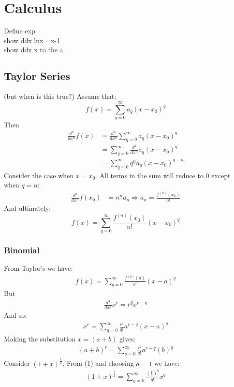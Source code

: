 \documentclass{article}
\renewcommand\({\left(}
\renewcommand\){\right)}
\begin{document}
\section{Calculus}
Define exp\\
show ddx lnx =x-1\\
show ddx x to the a\\
\subsection{Taylor Series}
(but when is this true?)
Assume that:
\[f(x)=\sum_{q=0}^\infty a_q(x-x_0)^q\]
Then
\begin{align*}
    \frac{d^n}{dx^n}f(x)&=\frac{d^n}{dx^n}\sum_{q=0}^\infty a_q(x-x_0)^q\\
    &=\sum_{q=0}^\infty \frac{d^n}{dx^n}a_q(x-x_0)^q\\
    &=\sum_{q=0}^\infty q^{\underline{n}}a_q(x-x_0)^{q-n}
\end{align*}
Consider the case when $x=x_0$. All terms in the sum will reduce to 0 except when $q=n$:
\begin{align*}
    \frac{d^n}{dx^n}f(x_0)&=n^{\underline{n}}a_n\Rightarrow a_n=\frac{f^{(n)}(x_0)}{n!}
\end{align*}
And ultimately:
\[f(x)=\sum_{q=0}^\infty \frac{f^{(n)}(x_0)}{n!}(x-x_0)^q\]
\subsubsection{Binomial}
From Taylor's we have:
\begin{align*}
    f(x)=\sum_{q=0}^\infty\frac{f^{(q)}(a)}{q!}(x-a)^q
\end{align*}
But 
\begin{align*}
    \frac{d^q}{dx^q}x^r=r^{\underline{q}}x^{r-q}
\end{align*}
And so:
\begin{align}
    x^r=\sum_{q=0}^\infty\frac{r^{\underline{q}}}{q!}a^{r-q}(x-a)^q
\end{align}
Making the substitution $x=(a+b)$ gives:
\begin{align*}
    (a+b)^r=\sum_{q=0}^\infty\frac{r^{\underline{q}}}{q!}a^{r-q}(b)^q
\end{align*}
Consider $(1+x)^\frac{1}{2}$. From (1) and choosing $a=1$ we have:
\begin{align*}
    (1+x)^\frac{1}{2}=\sum_{q=0}^\infty\frac{\left(\frac{1}{2}\right)^{\underline{q}}}{q!}x^q
\end{align*}
\end{document}
